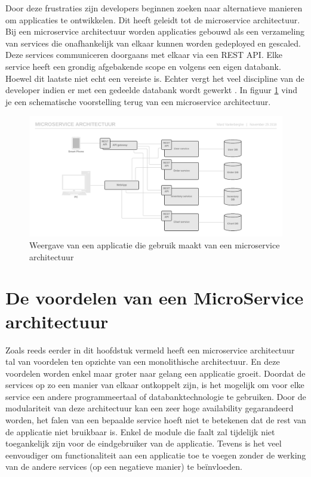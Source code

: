 Door deze frustraties zijn developers beginnen zoeken naar alternatieve manieren om applicaties te ontwikkelen. Dit heeft geleidt tot de microservice architectuur. Bij een microservice architectuur worden applicaties gebouwd als een verzameling van services die onafhankelijk van elkaar kunnen worden gedeployed en gescaled. Deze services communiceren doorgaans met elkaar via een \gls{REST API}. Elke service heeft een grondig afgebakende scope en volgens \textcite{Fowler2014} een eigen databank. Hoewel dit laatste niet echt een vereiste is. Echter vergt het veel discipline van de developer indien er met een gedeelde databank wordt gewerkt \autocite{Young2016}. In figuur \ref{fig:microservices} vind je een schematische voorstelling terug van een microservice architectuur.

\begin{figure}
	\includegraphics[width=\linewidth]{img/microservices.png}
	\caption{Weergave van een applicatie die gebruik maakt van een microservice architectuur}
	\label{fig:microservices}
\end{figure}

\section{De voordelen van een MicroService architectuur}
Zoals reeds eerder in dit hoofdstuk vermeld heeft een microservice architectuur tal van voordelen ten opzichte van een monolithische architectuur. En deze voordelen worden enkel maar groter naar gelang een applicatie groeit. Doordat de services op zo een manier van elkaar ontkoppelt zijn, is het mogelijk om voor elke service een andere programmeertaal of databanktechnologie te gebruiken. Door de modulariteit van deze architectuur kan een zeer hoge availability gegarandeerd worden, het falen van een bepaalde service hoeft niet te betekenen dat de rest van de applicatie niet bruikbaar is. Enkel de module die faalt zal tijdelijk niet toegankelijk zijn voor de eindgebruiker van de applicatie. Tevens is het veel eenvoudiger om functionaliteit aan een applicatie toe te voegen zonder de werking van de andere services (op een negatieve manier) te beïnvloeden.

